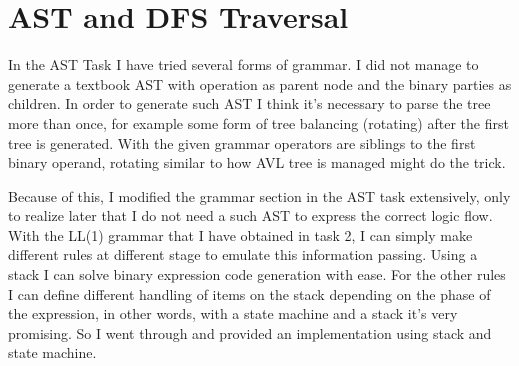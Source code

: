 \documentclass[11pt]{scrartcl}
\begin{document}
\section{AST and DFS Traversal}
In the AST Task I have tried several forms of grammar. I did not manage to generate a textbook AST with operation as parent node and the binary parties as children. In order to generate such AST I think it's necessary to parse the tree more than once, for example some form of tree balancing (rotating) after the first tree is generated. With the given grammar operators are siblings to the first binary operand, rotating similar to how AVL tree is managed might do the trick.

Because of this, I modified the grammar section in the AST task extensively, only to realize later that I do not need a such AST to express the correct logic flow. With the LL(1) grammar that I have obtained in task 2, I can simply make different rules at different stage to emulate this information passing. Using a stack I can solve binary expression code generation with ease. For the other rules I can define different  handling of items on the stack depending on the phase of the expression, in other words, with a state machine and a stack it's very promising. So I went through and provided an implementation using stack and state machine.
\vspace{4.8em}




\end{document}
